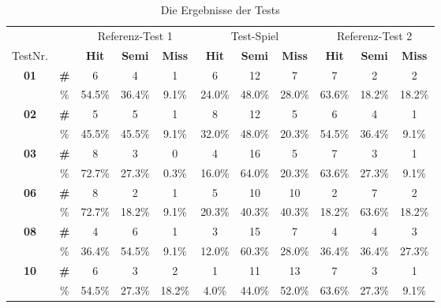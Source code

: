 \begin{table}[h!]
\centering
\footnotesize{
\setlength{\extrarowheight}{5pt}
\begin{tabular}{cc|ccc|ccc|ccc|}


\multicolumn{2}{c}{}			& \multicolumn{3}{c}{Referenz-Test 1} &	\multicolumn{3}{c}{Test-Spiel} & \multicolumn{3}{c}{Referenz-Test 2} 			\\
\multicolumn{1}{l}{TestNr.}	& \multicolumn{1}{c}{} 			& \multicolumn{1}{c}{\textbf{Hit}}	& \textbf{Semi}	& \multicolumn{1}{c}{\textbf{Miss}}	& \multicolumn{1}{c}{\textbf{Hit}}	& \textbf{Semi}	&\multicolumn{1}{c}{\textbf{Miss}} & \multicolumn{1}{c}{\textbf{Hit}}	& \textbf{Semi}	& \multicolumn{1}{c}{\textbf{Miss}}		\\ \cline{3-11}
\multirow{2}{*}{\textbf{01}}	&	\textbf{\#}	& 6		& 4		& 1		& 6		& 12	& 7		& 7		& 2		& 2		\\
								&	\%			& 54.5\%& 36.4\%& 9.1\%	& 24.0\%& 48.0\%& 28.0\%& 63.6\%& 18.2\%& 18.2\%\\ \cline{3-11}

\multirow{2}{*}{\textbf{02}}	&	\textbf{\#}	& 5		& 5		& 1		& 8		& 12	& 5		& 6		& 4		& 1		\\
								&	\%			& 45.5\%& 45.5\%& 9.1\%	& 32.0\%& 48.0\%& 20.3\%& 54.5\%& 36.4\%	& 9.1\%		\\ \cline{3-11}

\multirow{2}{*}{\textbf{03}}	&	\textbf{\#}	& 8		& 3		& 0		& 4		& 16	& 5		& 7		& 3		& 1		\\
								&	\%			& 72.7\%& 27.3\%& 0.3\%& 16.0\%& 64.0\%& 20.3\%& 63.6\%& 27.3\%& 9.1\% \\ \cline{3-11}

\multirow{2}{*}{\textbf{06}}	&	\textbf{\#}	& 8& 2& 1& 5& 10& 10& 2& 7& 2\\
								&	\%			& 72.7\%& 18.2\%& 9.1\%& 20.3\%& 40.3\%& 40.3\%& 18.2\%& 63.6\%& 18.2\%\\ \cline{3-11}

\multirow{2}{*}{\textbf{08}}	&	\textbf{\#}	& 4& 6& 1& 3& 15& 7& 4& 4& 3\\
								&	\%			& 36.4\%& 54.5\%& 9.1\%& 12.0\%& 60.3\%& 28.0\%& 36.4\%& 36.4\%& 27.3\%\\ \cline{3-11}

\multirow{2}{*}{\textbf{10}}	&	\textbf{\#}	& 6& 3& 2& 1& 11& 13& 7& 3& 1\\
								&	\%			& 54.5\%& 27.3\%& 18.2\%& 4.0\%& 44.0\%& 52.0\%& 63.6\%& 27.3\%& 9.1\%\\ \cline{3-11}	

								
								

							

\end{tabular}
}
\caption{Die Ergebnisse der Tests}
\label{tab:Ergebnisse}

\end{table}


